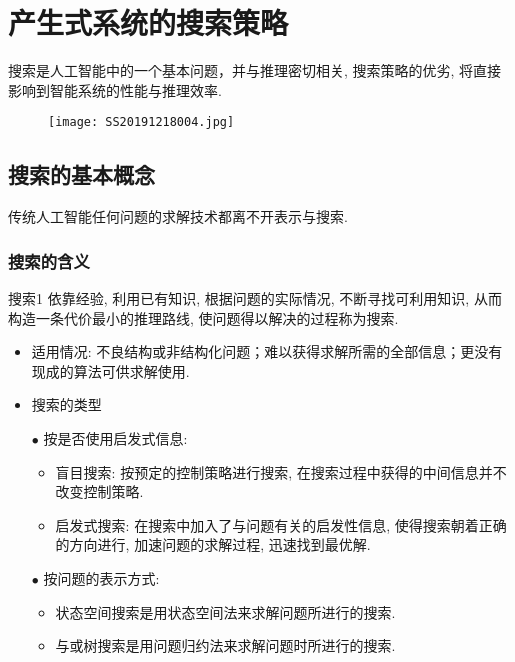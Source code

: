 \chapter{产生式系统的搜索策略}\label{AIchap4}
\begin{tcolorbox}[colback=white!50,colframe=orange!50,title=搜索]
搜索是人工智能中的一个基本问题，并与推理密切相关, 搜索策略的优劣, 将直接影响到智能系统的性能与推理效率.\hfill
\end{tcolorbox}
\begin{figure}[H]
\centering
\texttt{[image: SS20191218004.jpg]}
\label{SS20191218004}
\end{figure}
\section{搜索的基本概念}
传统人工智能任何问题的求解技术都离不开表示与搜索.
\subsection{搜索的含义}
\begin{mydef}{搜索}{1}
依靠经验, 利用已有知识, 根据问题的实际情况, 不断寻找可利用知识, 从而构造一条代价最小的推理路线, 使问题得以解决的过程称为搜索.
\end{mydef}

\begin{itemize}
\item 适用情况: 不良结构或非结构化问题；难以获得求解所需的全部信息；更没有现成的算法可供求解使用.
\item 搜索的类型

    $\bullet$ 按是否使用启发式信息:
    \begin{itemize}
        \item 盲目搜索: 按预定的控制策略进行搜索, 在搜索过程中获得的中间信息并不改变控制策略.
        \item 启发式搜索: 在搜索中加入了与问题有关的启发性信息, 使得搜索朝着正确的方向进行, 加速问题的求解过程, 迅速找到最优解.
    \end{itemize}
    $\bullet$ 按问题的表示方式:
    \begin{itemize}
        \item 状态空间搜索是用状态空间法来求解问题所进行的搜索.
        \item 与或树搜索是用问题归约法来求解问题时所进行的搜索.
    \end{itemize}
\end{itemize}
